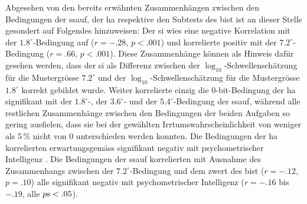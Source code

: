 \documentclass[11pt, twoside, a4paper]{book}		%
\begin{document}
Abgesehen von den bereits erwähnten Zusammenhängen zwischen den Bedingungen der \gls{ssauf}, der \gls{ha} respektive den Subtests des \gls{bist} ist an dieser Stelle gesondert auf Folgendes hinzuweisen:
Der \gls{si} wies eine negative Korrelation mit der $1.8^{\circ}$-Be\-ding\-ung auf ($r=-.28$, $p<.001$) und korrelierte positiv mit der $7.2^{\circ}$-Bedingung ($r=.66$, $p<.001$). 
Diese Zusammenhänge können als Hinweis dafür gesehen werden, dass der \gls{si} als Differenz zwischen der $\log_{10}$-Schwel\-len\-schätz\-ung für die Mustergrösse $7.2^{\circ}$ und der $\log_{10}$-Schwel\-len\-schätz\-ung für die Mustergrösse $1.8^{\circ}$ korrekt gebildet wurde.
Weiter korrelierte einzig die 0-bit-Bedingung der \gls{ha} signifikant mit der $1.8^{\circ}$-, der $3.6^{\circ}$- und der $5.4^{\circ}$-Bedingung der \gls{ssauf}, während alle restlichen Zusammenhänge zwischen den Bedingungen der beiden Aufgaben so gering ausfielen, dass sie bei der gewählten Irrtumswahrscheinlichkeit von weniger als $5\,\%$ nicht von 0 unterschieden werden konnten.
Die Bedingungen der \gls{ha} korrelierten erwartungsgemäss signifikant negativ mit psychometrischer Intelligenz \citep[$r=-.19$ bis $-.28$, alle $p\textnormal{s}<.05$; vgl. ][]{Sheppard2008}.
Die Bedingungen der \gls{ssauf} korrelierten mit Ausnahme des Zusammenhangs zwischen der $7.2^{\circ}$-Bedingung und dem \gls{zwert} des \gls{bist} ($r=-.12$, $p=.10$) alle signifikant negativ mit psychometrischer Intelligenz ($r=-.16$ bis $-.19$, alle $p\textnormal{s}<.05$).
\end{document}
